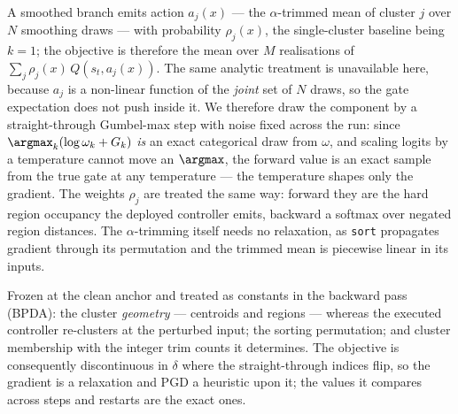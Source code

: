 A smoothed branch emits action $a_j(x)$ --- the $\alpha$-trimmed mean of cluster
$j$ over $N$ smoothing draws --- with probability $\rho_j(x)$, the single-cluster
baseline being $k=1$; the objective is therefore the mean over $M$ realisations of
$\sum_j \rho_j(x)\, Q(s_t, a_j(x))$. The same analytic treatment is unavailable
here, because $a_j$ is a non-linear function of the \emph{joint} set of $N$ draws,
so the gate expectation does not push inside it. We therefore draw the component
by a straight-through Gumbel-max step with noise fixed across the run: since
$\argmax_k(\log\omega_k + G_k)$ \emph{is} an exact categorical draw from $\omega$,
and scaling logits by a temperature cannot move an $\argmax$, the forward value is
an exact sample from the true gate at any temperature --- the temperature shapes
only the gradient. The weights $\rho_j$ are treated the same way: forward they are
the hard region occupancy the deployed controller emits, backward a softmax over
negated region distances. The $\alpha$-trimming itself needs no relaxation, as
\texttt{sort} propagates gradient through its permutation and the trimmed mean is
piecewise linear in its inputs.

Frozen at the clean anchor and treated as constants in the backward pass (BPDA):
the cluster \emph{geometry} --- centroids and regions --- whereas the executed
controller re-clusters at the perturbed input; the sorting permutation; and
cluster membership with the integer trim counts it determines. The objective is
consequently discontinuous in $\delta$ where the straight-through indices flip, so
the gradient is a relaxation and PGD a heuristic upon it; the values it compares
across steps and restarts are the exact ones.

